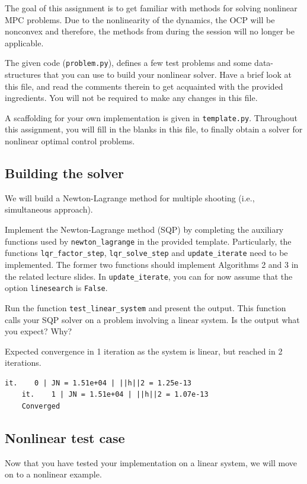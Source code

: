 \documentclass[]{article}
\begin{document}
The goal of this assignment is to get familiar with methods for solving nonlinear MPC problems. 
Due to the nonlinearity of the dynamics, the OCP
will be nonconvex and therefore, the methods from during the session will no longer be applicable. 

The given code (\texttt{problem.py}), 
defines a few test problems and some data-structures that 
you can use to build your nonlinear solver. Have a brief 
look at this file, and read the comments therein
to get acquainted with the provided ingredients.
You will not be required to make any changes 
in this file.  

A scaffolding for your own implementation is given 
in \texttt{template.py}. Throughout this 
assignment, you will fill in the blanks in this file, 
to finally obtain a solver for nonlinear optimal control problems.

\subsection{Building the solver}
We will build a Newton-Lagrange method 
for multiple shooting (i.e., simultaneous approach).

\begin{assignment}
	Implement the Newton-Lagrange method (SQP) by 
	completing the auxiliary functions used by \texttt{newton\_lagrange} in 
	the provided template. Particularly, 
	the functions \texttt{lqr\_factor\_step}, \texttt{lqr\_solve\_step}
	and \texttt{update\_iterate} need to be implemented. The former two functions should implement 
	Algorithms 2 and 3 in the related lecture slides. 
	In \texttt{update\_iterate}, you can for now assume that the option \texttt{linesearch} is \texttt{False}.

	Run the function \texttt{test\_linear\_system} and present the output.
	This function calls your SQP solver on a problem involving 
	a linear system. Is the output what you expect? Why?
\end{assignment}
\begin{flushleft}
	Expected convergence in 1 iteration as the system is linear, but reached in 2 iterations. 
\end{flushleft}
\begin{lstlisting}[style=python]
	it.    0 | JN = 1.51e+04 | ||h||2 = 1.25e-13
	it.    1 | JN = 1.51e+04 | ||h||2 = 1.07e-13
	Converged
\end{lstlisting}



\subsection{Nonlinear test case}
Now that you have tested your implementation on a linear system,
we will move on to a nonlinear example.
\end{document}
